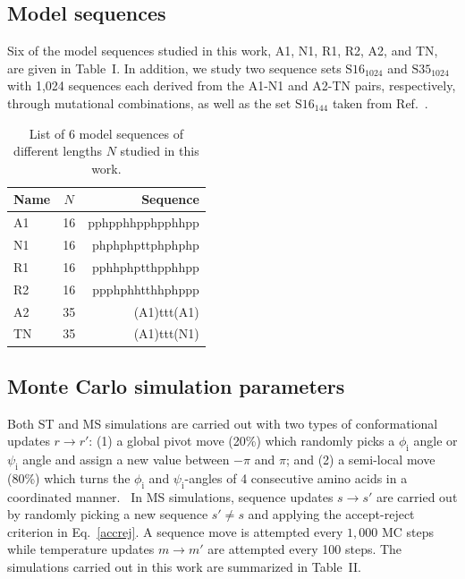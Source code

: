 \documentclass[
aip,
rsi,%
amsmath,amssymb,
reprint,%
]{revtex4-1}
\newcommand	 {\sbar}	{{s}}
\newcommand	 {\rbar}	{{r}}
\begin{document}
\subsection{Model sequences}
\noindent
Six of the model sequences studied in this work, A1, N1, R1, R2, A2, and TN, are given in Table~I. In addition, we study two sequence sets $\mathrm{S16}_{1024}$  and $\mathrm{S35}_{1024}$ with 1,024 sequences each derived from the A1-N1 and A2-TN pairs, respectively, through mutational combinations, as well as the set $\mathrm{S16}_{144}$ taken from  Ref.~\protect{}. 
 
\begin{table}
\caption{\label{tab1} List of 6 model sequences of different lengths $N$ studied in this work.}
\begin{ruledtabular}
\begin{tabular}{lcr}
Name & $N$ & Sequence \\
\hline
A1 & 16 & pphpphhpphpphhpp \\
N1 & 16 & phphphpttphphphp \\
R1 & 16 & pphhphptthpphhpp\\
R2 & 16 & ppphphhtthhphppp\\
A2 & 35 & (A1)ttt(A1)\\
TN & 35 & (A1)ttt(N1)\\
\end{tabular}
\end{ruledtabular}
\end{table}


\subsection{Monte Carlo simulation parameters}
\noindent
Both ST and MS simulations are carried out with two types of conformational updates $\rbar\rightarrow\rbar'$: (1) a global pivot move (20\%) which randomly picks a $\phi_\mathrm{i}$ angle or $\psi_\mathrm{i}$ angle and assign a new value between $-\pi$ and $\pi$; and (2) a semi-local move (80\%) which turns the $\phi_\mathrm{i}$ and $\psi_\mathrm{i}$-angles of 4 consecutive amino acids in a coordinated manner.~\cite{Favrin2001} In MS simulations, sequence updates $\sbar\rightarrow\sbar'$ are carried out by randomly picking a new sequence $\sbar'\ne\sbar$ and applying the accept-reject criterion in Eq.~\ref{accrej}. A sequence move is attempted every $1,000$ MC steps while temperature updates $m\rightarrow m'$ are attempted every 100 steps. The simulations carried out in this work are summarized in Table~II.
\end{document}
